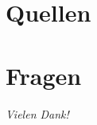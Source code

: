 \documentclass{beamer}
\begin{document}
    \section{Quellen}\label{sec:quellen}
    \begin{frame}[allowframebreaks]
        \nocite{*}
        \printbibliography[heading=none]
    \end{frame}


    \section{Fragen}\label{sec:fragen}
    \begin{frame}
        \centering \Large
        \emph{Vielen Dank!}
    \end{frame}
\end{document}
